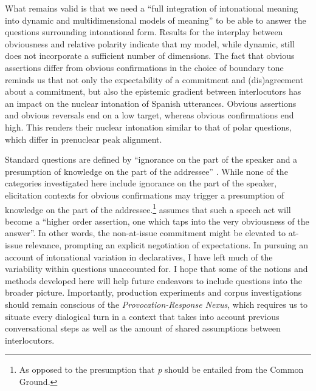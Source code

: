 What remains valid is that we need a “full integration of intonational meaning into dynamic and multidimensional models of meaning” \citep[371]{Prieto.2015} to be able to answer the questions surrounding intonational form. Results for the interplay between obviousness and relative polarity indicate that my model, while dynamic, still does not incorporate a sufficient number of dimensions. The fact that obvious assertions differ from obvious confirmations in the choice of boundary tone reminds us that not only the expectability of a commitment and (dis)agreement about a commitment, but also the epistemic gradient \citep[32]{Heritage.2012epistemicengine} between interlocutors has an impact on the nuclear intonation of Spanish utterances. Obvious assertions and obvious reversals end on a low target, whereas obvious confirmations end high. This renders their nuclear intonation similar to that of polar questions, which differ in prenuclear peak alignment.

Standard questions are defined by ``ignorance on the part of the speaker and a presumption of knowledge on the part of the addressee'' \citep[289]{Dayal.2016}. While none of the categories investigated here include ignorance on the part of the speaker, elicitation contexts for obvious confirmations may trigger a presumption of knowledge on the part of the addressee.\footnote{As opposed to the presumption that \textit{p} should be entailed from the Common Ground.} \citet[284]{Dayal.2016} assumes that such a speech act will become a ``higher order assertion, one which taps into the very obviousness of the answer''. In other words, the non-at-issue commitment might be elevated to at-issue relevance, prompting an explicit negotiation of expectations. In pursuing an account of intonational variation in declaratives, I have left much of the variability within questions unaccounted for. I hope that some of the notions and methods developed here will help future endeavors to include questions into the broader picture. Importantly, production experiments and corpus investigations should remain conscious of the \textit{Provocation-Response Nexus}, which requires us to situate every dialogical turn in a context that takes into account previous conversational steps as well as the amount of shared assumptions between interlocutors. 

